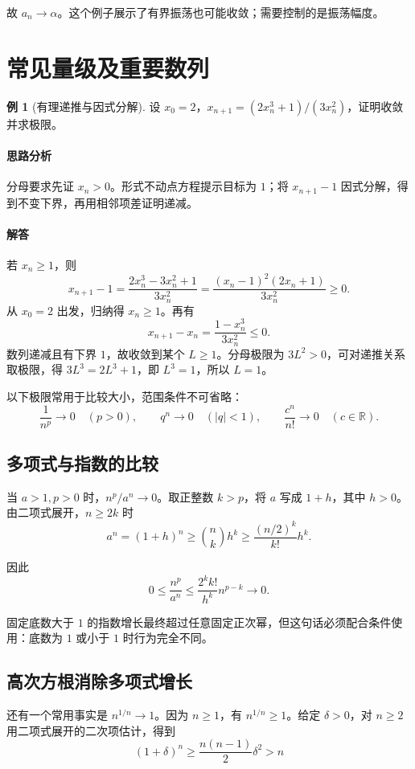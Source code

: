 \documentclass[UTF8,fontset=fandol,12pt,oneside,openany]{ctexrep}
\theoremstyle{definition}
\newtheorem{example}{例}[chapter]
\begin{document}
故 $a_n\to\alpha$。这个例子展示了有界振荡也可能收敛；需要控制的是振荡幅度。

\section{常见量级及重要数列}

\begin{example}[有理递推与因式分解]
设 $x_0=2$，$x_{n+1}=(2x_n^3+1)/(3x_n^2)$，证明收敛并求极限。
\end{example}
\paragraph{思路分析} 分母要求先证 $x_n>0$。形式不动点方程提示目标为 $1$；将 $x_{n+1}-1$ 因式分解，得到不变下界，再用相邻项差证明递减。
\paragraph{解答} 若 $x_n\ge1$，则
\[
x_{n+1}-1=\frac{2x_n^3-3x_n^2+1}{3x_n^2}
=\frac{(x_n-1)^2(2x_n+1)}{3x_n^2}\ge0.
\]
从 $x_0=2$ 出发，归纳得 $x_n\ge1$。再有
\[
x_{n+1}-x_n=\frac{1-x_n^3}{3x_n^2}\le0.
\]
数列递减且有下界 $1$，故收敛到某个 $L\ge1$。分母极限为 $3L^2>0$，可对递推关系取极限，得 $3L^3=2L^3+1$，即 $L^3=1$，所以 $L=1$。

以下极限常用于比较大小，范围条件不可省略：
\[
\frac1{n^p}\to0\quad(p>0),\qquad q^n\to0\quad(|q|<1),\qquad\frac{c^n}{n!}\to0\quad(c\in\mathbb R).
\]

\subsection*{多项式与指数的比较}

当 $a>1,p>0$ 时，$n^p/a^n\to0$。取正整数 $k>p$，将 $a$ 写成 $1+h$，其中 $h>0$。由二项式展开，$n\ge2k$ 时
\[
a^n=(1+h)^n\ge\binom nk h^k
\ge\frac{(n/2)^k}{k!}h^k.
\]

因此
\[
0\le\frac{n^p}{a^n}\le\frac{2^kk!}{h^k}n^{p-k}\to0.
\]

固定底数大于 $1$ 的指数增长最终超过任意固定正次幂，但这句话必须配合条件使用：底数为 $1$ 或小于 $1$ 时行为完全不同。

\subsection{高次方根消除多项式增长}

还有一个常用事实是 $n^{1/n}\to1$。因为 $n\ge1$，有 $n^{1/n}\ge1$。给定 $\delta>0$，对 $n\ge2$ 用二项式展开的二次项估计，得到
\[
(1+\delta)^n\ge\frac{n(n-1)}2\delta^2>n
\]
\end{document}
